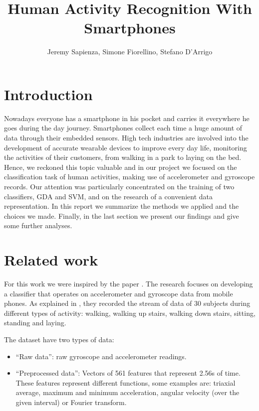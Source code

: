 \documentclass[a4paper,10pt,oneside]{article}
\title{Human Activity Recognition With Smartphones}
\author{Jeremy Sapienza, Simone Fiorellino, Stefano D'Arrigo}
\begin{document}
\maketitle

\begin{abstract}
 
\end{abstract}



\section{Introduction}
Nowadays everyone has a smartphone in his pocket and carries it everywhere he goes during the day journey. Smartphones collect each time a huge amount of data through their embedded sensors. High tech industries are involved into the development of accurate wearable devices to improve every day life, monitoring the activities of their customers, from walking in a park to laying on the bed.\\
Hence, we reckoned this topic valuable and in our project we focused on the classification task of human activities, making use of accelerometer and gyroscope records. Our attention was particularly concentrated on the training of two classifiers, GDA and SVM,  and on the research of a convenient data representation.
In this report we summarize the methods we applied and the choices we made. Finally, in the last section we present our findings and give some further analyses.


\section{Related work}
For this work we were inspired by the paper \cite{brown2013activity}.
The research focuses on developing a classifier that operates on accelerometer and gyroscope data from mobile phones.
As explained in \cite{anuita2013human}, they recorded the stream of data of 30 subjects during different types of activity: walking, walking up stairs, walking down stairs, sitting, standing and laying.

The dataset have two types of data:
\begin{itemize}
 \item “Raw data”: raw gyroscope and accelerometer readings.
 \item “Preprocessed data”: Vectors of  561 features that represent 2.56s of time. These features represent different functions, some examples are: triaxial average, maximum and minimum acceleration, angular velocity (over the given interval) or Fourier transform.
\end{itemize}
\end{document}
